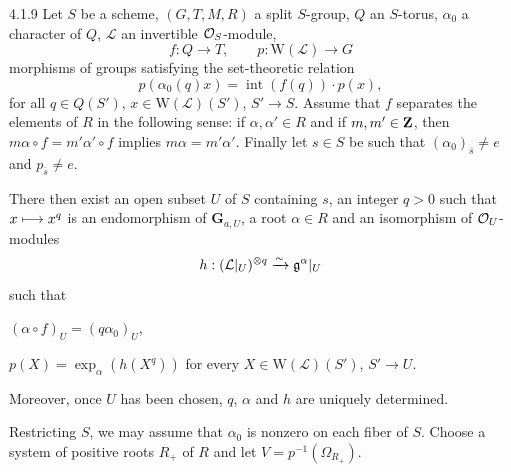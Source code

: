 \begin{proposition}{4.1.9}\label{XXII.4.1.9}
Let $S$ be a scheme, $(G,T,M,R)$ a split $S$-group, $Q$ an $S$-torus, $\alpha_0$ a character of $Q$, $\mathcal L$ an invertible $\mathcal{O}_S$-module,
\[
f:Q\to T,\qquad p:\mathrm W(\mathcal L)\to G
\]
morphisms of groups satisfying the set-theoretic relation
\[
p(\alpha_0(q)x)=\operatorname{int}(f(q))\cdot p(x),
\]
for all $q\in Q(S')$, $x\in\mathrm W(\mathcal L)(S')$, $S'\to S$. Assume that $f$ separates the elements of $R$ in the following sense: if $\alpha,\alpha'\in R$ and if $m,m'\in\mathbf{Z}$, then $m\alpha\circ f=m'\alpha'\circ f$ implies $m\alpha=m'\alpha'$.{\renewcommand{\thefootnote}{(16)}} Finally let $s\in S$ be such that $(\alpha_0)_{\overline s}\ne e$ and $p_{\overline s}\ne e$.

There then exist an open subset $U$ of $S$ containing $s$, an integer $q>0$ such that $x\longmapsto x^q$ is an endomorphism of $\mathbf G_{a,U}$, a root $\alpha\in R$ and an isomorphism of $\mathcal{O}_U$-modules
\[
h:(\mathcal L|_U)^{\otimes q}\xrightarrow{\sim}\mathfrak g^\alpha|_U
\]
such that
\begin{enumeratei}
\item $(\alpha\circ f)_U=(q\alpha_0)_U$,
\item $p(X)=\exp_\alpha(h(X^q))$ for every $X\in\mathrm W(\mathcal L)(S')$, $S'\to U$.
\end{enumeratei}
Moreover, once $U$ has been chosen, $q$, $\alpha$ and $h$ are uniquely determined.
\end{proposition}
Restricting $S$, we may assume that $\alpha_0$ is nonzero on each fiber of $S$. Choose a system of positive roots $R_+$ of $R$ and let $V=p^{-1}(\Omega_{R_+})$.
